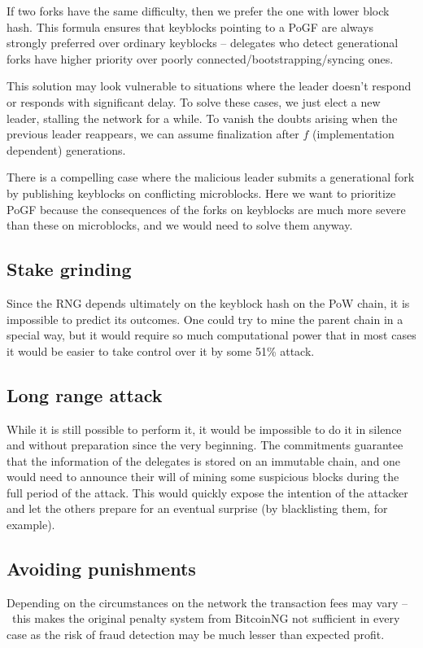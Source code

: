 If two forks have the same difficulty, then we prefer the one with lower
block hash. This formula ensures that keyblocks pointing to a PoGF are always
strongly preferred over ordinary keyblocks – delegates who detect generational
forks have higher priority over poorly connected/bootstrapping/syncing ones.

This solution may look vulnerable to situations where the leader doesn't respond
or responds with significant delay. To solve these cases, we just elect a new
leader, stalling the network for a while. To vanish the doubts arising when the
previous leader reappears, we can assume
finalization after $f$ (implementation dependent) generations.

There is a compelling case where the malicious leader submits a generational
fork by publishing keyblocks on conflicting microblocks.
Here we want to prioritize PoGF because the consequences of the forks on
keyblocks are much more severe than these on microblocks, and we would need to
solve them anyway.

\subsection{Stake grinding}

Since the RNG depends ultimately on the keyblock hash on the PoW chain, it is
impossible to predict its outcomes. One could try to mine the parent chain
in a special way, but it would require so much computational power that in
most cases it would be easier to take control over it by some 51\% attack.

\subsection{Long range attack}
While it is still possible to perform it, it would be impossible to do it in
silence and without preparation since the very beginning. The commitments
guarantee that the information of the delegates is stored on an immutable chain,
and one would need to announce their will of mining some suspicious blocks during
the full period of the attack. This would quickly expose the intention of the attacker
and let the others prepare for an eventual surprise (by blacklisting them, for example).

\subsection{Avoiding punishments}
Depending on the circumstances on the network the transaction fees may vary
– this makes the original penalty system from BitcoinNG not sufficient in every
case as the risk of fraud detection may be much lesser than expected profit.

